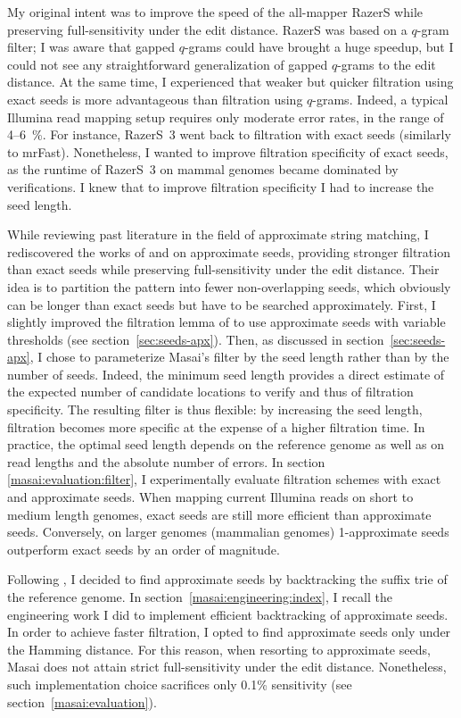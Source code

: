 My original intent was to improve the speed of the all-mapper RazerS \citep{Weese2009} while preserving full-sensitivity under the edit distance.
RazerS was based on a $q$-gram filter;
I was aware that gapped $q$-grams could have brought a huge speedup, but I could not see any straightforward generalization of gapped $q$-grams to the edit distance.
At the same time, I experienced that weaker but quicker filtration using exact seeds is more advantageous than filtration using $q$-grams.
Indeed, a typical Illumina read mapping setup requires only moderate error rates, in the range of 4--6~\%.
For instance, RazerS~3 \citep{Weese2012} went back to filtration with exact seeds (similarly to mrFast).
Nonetheless, I wanted to improve filtration specificity of exact seeds, as the runtime of RazerS~3 on mammal genomes became dominated by verifications.
I knew that to improve filtration specificity I had to increase the seed length.

While reviewing past literature in the field of approximate string matching, I rediscovered the works of \cite{Myers1994} and \cite{Navarro2000} on approximate seeds, providing stronger filtration than exact seeds while preserving full-sensitivity under the edit distance.
Their idea is to partition the pattern into fewer non-overlapping seeds, which obviously can be longer than exact seeds but have to be searched approximately.
First, I slightly improved the filtration lemma of \citep{Navarro2000} to use approximate seeds with variable thresholds (see section~\ref{sec:seeds-apx}).
Then, as discussed in section~\ref{sec:seeds-apx}, I chose to parameterize Masai's filter by the seed length rather than by the number of seeds.
Indeed, the minimum seed length provides a direct estimate of the expected number of candidate locations to verify and thus of filtration specificity.
The resulting filter is thus flexible: by increasing the seed length, filtration becomes more specific at the expense of a higher filtration time.
In practice, the optimal seed length depends on the reference genome as well as on read lengths and the absolute number of errors.
In section \ref{masai:evaluation:filter}, I experimentally evaluate filtration schemes with exact and approximate seeds.
When mapping current Illumina reads on short to medium length genomes, exact seeds are still more efficient than approximate seeds.
Conversely, on larger genomes (\eg mammalian genomes) 1-approximate seeds outperform exact seeds by an order of magnitude.

Following \citep{Navarro2000}, I decided to find approximate seeds by backtracking the suffix trie of the reference genome.
In section~\ref{masai:engineering:index}, I recall the engineering work I did to implement efficient backtracking of approximate seeds.
In order to achieve faster filtration, I opted to find approximate seeds only under the Hamming distance.
For this reason, when resorting to approximate seeds, Masai does not attain strict full-sensitivity under the edit distance.
Nonetheless, such implementation choice sacrifices only 0.1\% sensitivity (see section~\ref{masai:evaluation}).

